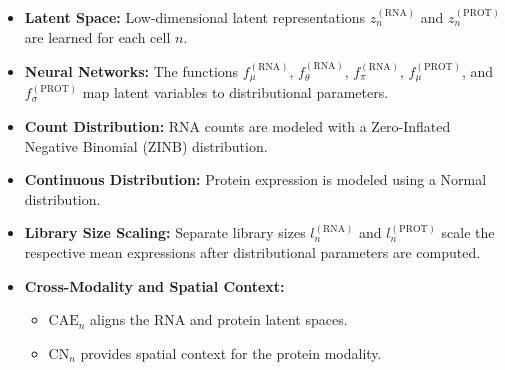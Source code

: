 \documentclass{article}
\begin{document}
\begin{itemize}
    \item \textbf{Latent Space:} Low-dimensional latent representations \( z^{(\text{RNA})}_n \) and \( z^{(\text{PROT})}_n \) are learned for each cell \( n \).
    \item \textbf{Neural Networks:} The functions \( f^{(\text{RNA})}_\mu \), \( f^{(\text{RNA})}_\theta \), \( f^{(\text{RNA})}_\pi \), \( f^{(\text{PROT})}_\mu \), and \( f^{(\text{PROT})}_\sigma \) map latent variables to distributional parameters.
    \item \textbf{Count Distribution:} RNA counts are modeled with a Zero-Inflated Negative Binomial (ZINB) distribution.
    \item \textbf{Continuous Distribution:} Protein expression is modeled using a Normal distribution.
    \item \textbf{Library Size Scaling:} Separate library sizes \( l^{(\text{RNA})}_n \) and \( l^{(\text{PROT})}_n \) scale the respective mean expressions after distributional parameters are computed.
    \item \textbf{Cross-Modality and Spatial Context:}
        \begin{itemize}
            \item \(\text{CAE}_n\) aligns the RNA and protein latent spaces.
            \item \(\text{CN}_n\) provides spatial context for the protein modality.
        \end{itemize}
\end{itemize}
\end{document}

